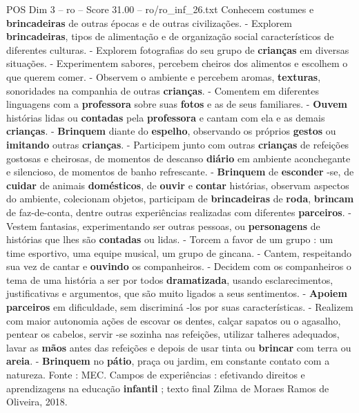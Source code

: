 \begin{textsample}{POS Dim 3 – ro – Score 31.00 – ro/ro\_inf\_26.txt}
Conhecem costumes e \textbf{brincadeiras} de outras épocas e de outras civilizações. - Explorem \textbf{brincadeiras}, tipos de alimentação e de organização social característicos de diferentes culturas. - Explorem fotografias do seu grupo de \textbf{crianças} em diversas situações. - Experimentem sabores, percebem cheiros dos alimentos e escolhem o que querem comer. - Observem o ambiente e percebem aromas, \textbf{texturas}, sonoridades na companhia de outras \textbf{crianças}. - Comentem em diferentes linguagens com a \textbf{professora} sobre suas \textbf{fotos} e as de seus familiares. - \textbf{Ouvem} histórias lidas ou \textbf{contadas} pela \textbf{professora} e cantam com ela e as demais \textbf{crianças}. - \textbf{Brinquem} diante do \textbf{espelho}, observando os próprios \textbf{gestos} ou \textbf{imitando} outras \textbf{crianças}. - Participem junto com outras \textbf{crianças} de refeições gostosas e cheirosas, de momentos de descanso \textbf{diário} em ambiente aconchegante e silencioso, de momentos de banho refrescante. - \textbf{Brinquem} de \textbf{esconder} -se, de \textbf{cuidar} de animais \textbf{domésticos}, de \textbf{ouvir} e \textbf{contar} histórias, observam aspectos do ambiente, colecionam objetos, participam de \textbf{brincadeiras} de \textbf{roda}, \textbf{brincam} de faz-de-conta, dentre outras experiências realizadas com diferentes \textbf{parceiros}. - Vestem fantasias, experimentando ser outras pessoas, ou \textbf{personagens} de histórias que lhes são \textbf{contadas} ou lidas. - Torcem a favor de um grupo : um time esportivo, uma equipe musical, um grupo de gincana. - Cantem, respeitando sua vez de cantar e \textbf{ouvindo} os companheiros. - Decidem com os companheiros o tema de uma história a ser por todos \textbf{dramatizada}, usando esclarecimentos, justificativas e argumentos, que são muito ligados a seus sentimentos. - \textbf{Apoiem} \textbf{parceiros} em dificuldade, sem discriminá -los por suas características. - Realizem com maior autonomia ações de escovar os dentes, calçar sapatos ou o agasalho, pentear os cabelos, servir -se sozinha nas refeições, utilizar talheres adequados, lavar as \textbf{mãos} antes das refeições e depois de usar tinta ou \textbf{brincar} com terra ou \textbf{areia}. - \textbf{Brinquem} no \textbf{pátio}, praça ou jardim, em constante contato com a natureza.
Fonte : MEC.
Campos de experiências : efetivando direitos e aprendizagens na educação \textbf{infantil} ; texto final Zilma de Moraes Ramos de Oliveira, 2018.

\end{textsample}
